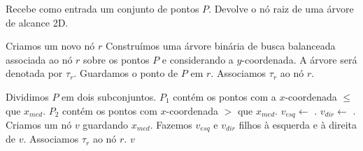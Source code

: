 \begin{algorithm}[h!]
    \caption{Recebe como entrada um conjunto de pontos $P$. Devolve o nó raiz de uma árvore de alcance 2D.}
    \begin{algorithmic}[1]
    \State Criamos um novo nó $r$
        \State Construímos uma árvore binária de busca balanceada associada ao nó $r$ sobre os pontos $P$ e considerando a $y$-coordenada. A árvore será denotada por $\tau_r$.%
            \State Guardamos o ponto de $P$ em $r$.
            \State Associamos $\tau_r$ ao nó $r$. %
            
        \Else
            \State Dividimos $P$ em dois subconjuntos. 
            \State $P_1$ contém os pontos com a $x$-coordenada $\leq$ que $x_{med}$.
            \State $P_2$ contém os pontos com $x$-coordenada $>$ que $x_{med}$.
            \State $v_{esq} \leftarrow $ .
            \State $v_{dir} \leftarrow $ .
            \State Criamos um nó $v$ guardando $x_{med}$.
            \State Fazemos $v_{esq}$ e $v_{dir}$ filhos à esquerda e à direita de $v$.
            \State Associamos $\tau_{r}$ ao nó $r$.
        \EndIf
    \State\Return $v$
    \EndFunction
    \end{algorithmic}
\end{algorithm}


